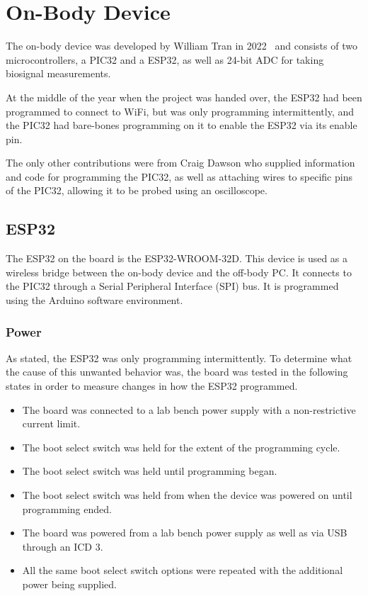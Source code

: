 \chapter{On-Body Device}
The on-body device was developed by William Tran in 2022~\cite{Tran:2022} and consists of two microcontrollers,
a PIC32 and a ESP32, as well as 24-bit ADC for taking biosignal measurements.

At the middle of the year when the project was handed over,
the ESP32 had been programmed to connect to WiFi, but was only programming intermittently,
and the PIC32 had bare-bones programming on it to enable the ESP32 via its enable pin.

The only other contributions were from Craig Dawson who supplied information and code for programming the PIC32,
as well as attaching wires to specific pins of the PIC32, allowing it to be probed using an oscilloscope.


\section{ESP32}
The ESP32 on the board is the ESP32-WROOM-32D.
This device is used as a wireless bridge between the on-body device and the off-body PC.
It connects to the PIC32 through a Serial Peripheral Interface (SPI) bus.
It is programmed using the Arduino software environment.

\subsection{Power}
As stated, the ESP32 was only programming intermittently.
To determine what the cause of this unwanted behavior was,
the board was tested in the following states in order to measure changes in how the ESP32 programmed.

\begin{itemize}
        \item The board was connected to a lab bench power supply with a non-restrictive current limit.
        \item The boot select switch was held for the extent of the programming cycle.
        \item The boot select switch was held until programming began.
        \item The boot select switch was held from when the device was powered on until programming ended.
        \item The board was powered from a lab bench power supply as well as via USB through an ICD 3.
        \item All the same boot select switch options were repeated with the additional power being supplied.
\end{itemize}

